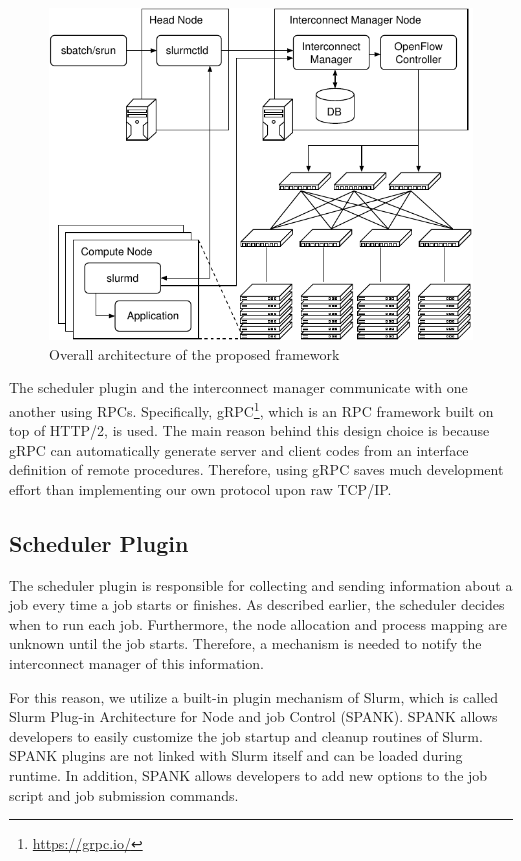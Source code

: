 \documentclass[graybox]{svmult}
\begin{document}
\begin{figure}
    \centering
    \includegraphics{architecture}
    \caption{Overall architecture of the proposed framework}%
    \label{kt:fig:architecture}
\end{figure}

The scheduler plugin and the interconnect manager communicate with one another
using RPCs. Specifically, gRPC\footnote{\url{https://grpc.io/}}, which is an
RPC framework built on top of HTTP/2, is used. The main reason behind this
design choice is because gRPC can automatically generate server and client
codes from an interface definition of remote procedures. Therefore, using gRPC
saves much development effort than implementing our own protocol upon raw
TCP/IP\@.

\subsection{Scheduler Plugin}

The scheduler plugin is responsible for collecting and sending information
about a job every time a job starts or finishes. As described earlier,
the scheduler decides when to run each job. Furthermore, the node allocation
and process mapping are unknown until the job starts. Therefore, a mechanism
is needed to notify the interconnect manager of this information.

For this reason, we utilize a built-in plugin mechanism of Slurm, which is
called Slurm Plug-in Architecture for Node and job Control (SPANK). SPANK
allows developers to easily customize the job startup and cleanup routines of
Slurm. SPANK plugins are not linked with Slurm itself and can be loaded during
runtime. In addition, SPANK allows developers to add new options to the job
script and job submission commands.
\end{document}
